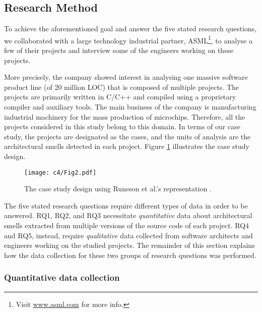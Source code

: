 \subsection{Research Method}
To achieve the aforementioned goal and answer the five stated research questions, we collaborated with a large technology industrial partner, ASML\footnote{Visit \url{www.asml.com} for more info.}, to analyse a few of their projects and interview some of the engineers working on these projects. 

More precisely, the company showed interest in analysing one massive software product line (of 20 million LOC) that is composed of multiple projects.
The projects are primarily written in C/C++ and compiled using a proprietary compiler and auxiliary tools.
The main business of the company is manufacturing industrial machinery for the mass production of microchips. Therefore, all the projects considered in this study belong to this domain. In terms of our case study, the projects are designated as the cases, and the units of analysis are the architectural smells detected in each project. Figure \ref{c4:fig:case-design} illustrates the case study design.

\begin{figure}[h]
    \centering
    \texttt{[image: c4/Fig2.pdf]}
    \caption{The case study design using Runeson et al.'s representation \cite{Runeson2012}.}
    \label{c4:fig:case-design}
\end{figure}

The five stated research questions require different types of data in order to be answered.
RQ1, RQ2, and RQ3 necessitate \emph{quantitative} data about architectural smells extracted from multiple versions of the source code of each project.
RQ4 and RQ5, instead, require \emph{qualitative} data collected from software architects and engineers working on the studied projects.
The remainder of this section explains how the data collection for these two groups of research questions was performed.

\subsubsection{Quantitative data collection}
